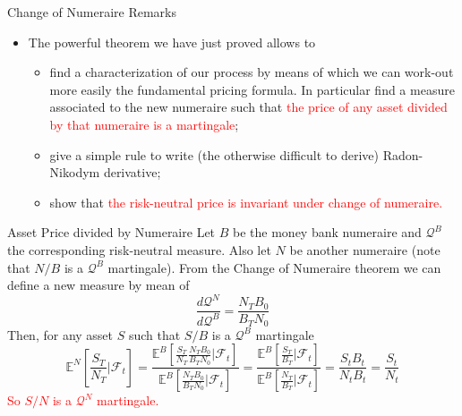 \documentclass{beamer}
\begin{document}
\begin{frame}{Change of Numeraire Remarks}
  \begin{itemize}
  \item The powerful theorem we have just proved allows to
    \begin{itemize}
    \item find a characterization of our process by means of which we can work-out more easily the fundamental pricing formula. In particular find a measure associated to the new numeraire such that \textcolor{red}{the price of any asset divided by that numeraire is a martingale};
    \item give a simple rule to write (the otherwise difficult to derive) Radon-Nikodym derivative;
    \item show that \textcolor{red}{the risk-neutral price is invariant under change of numeraire.}
    \end{itemize}
  \end{itemize}
\end{frame}

\begin{frame}{Asset Price divided by Numeraire}
  Let $B$ be the money bank numeraire and $\mathcal{Q}^B$ the corresponding risk-neutral measure. Also let $N$ be another numeraire (note that $N/B$ is a $\mathcal{Q}^B$ martingale). 
	\pause
  From the Change of Numeraire theorem we can define a new measure by mean of
  \begin{equation*}
    \frac{d\mathcal{Q}^N}{d\mathcal{Q}^B} = \frac{N_TB_0}{B_TN_0}
  \end{equation*}
	\pause
  Then, for any asset $S$ such that $S/B$ is a $\mathcal{Q}^B$ martingale
  \begin{equation*}
    \mathbb{E}^N\left[\frac{S_T}{N_T}\bigg|\mathcal{F}_t\right] = \frac{\mathbb{E}^B\left[\frac{S_T}{N_T}\frac{N_TB_0}{B_TN_0}\bigg|\mathcal{F}_t\right]}{\mathbb{E}^B\left[\frac{N_TB_0}{B_TN_0}\bigg|\mathcal{F}_t\right]}
    =\frac{\mathbb{E}^B\left[\frac{S_T}{B_T}\bigg|\mathcal{F}_t\right]}
    {\mathbb{E}^B\left[\frac{N_T}{B_T}\bigg|\mathcal{F}_t\right]}
    =\frac{S_tB_t}{N_tB_t}=\frac{S_t}{N_t}
  \end{equation*}
  \textcolor{red}{So $S/N$ is a $\mathcal{Q}^N$ martingale.}
\end{frame}
\end{document}
